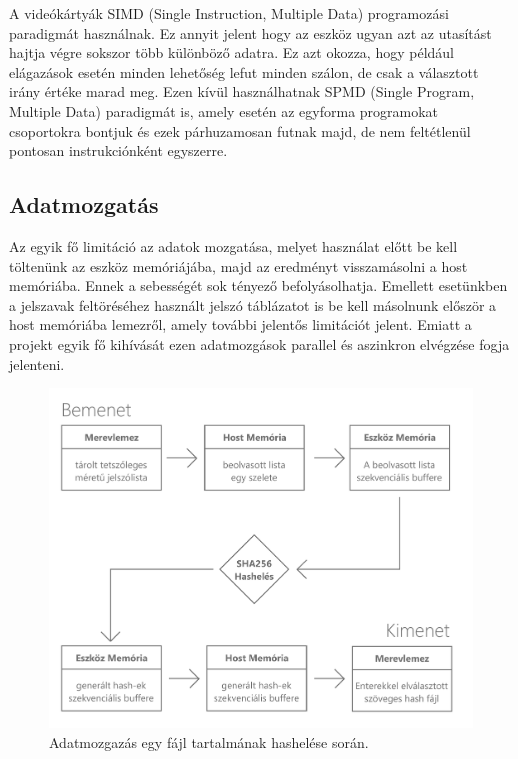 A videókártyák SIMD (Single Instruction, Multiple Data) programozási paradigmát használnak. Ez annyit jelent hogy az eszköz ugyan azt az utasítást hajtja végre sokszor több különböző adatra. Ez azt okozza, hogy például elágazások esetén minden lehetőség lefut minden szálon, de csak a választott irány értéke marad meg. Ezen kívül használhatnak SPMD (Single Program, Multiple Data) paradigmát is, amely esetén az egyforma programokat csoportokra bontjuk és ezek párhuzamosan futnak majd, de nem feltétlenül pontosan instrukciónként egyszerre. 



\subsection{Adatmozgatás}

Az egyik fő limitáció az adatok mozgatása, melyet használat előtt be kell töltenünk az eszköz memóriájába, majd az eredményt visszamásolni a host memóriába. Ennek a sebességét sok tényező befolyásolhatja. Emellett esetünkben a jelszavak feltöréséhez használt jelszó táblázatot is be kell másolnunk először a host memóriába lemezről, amely további jelentős limitációt jelent. Emiatt a projekt egyik fő kihívását ezen adatmozgások parallel és aszinkron elvégzése fogja jelenteni.


\begin{figure}[H]
    \centering 
    \includegraphics[width=\textwidth]{images/pdf/data-movement.pdf}
    \caption{Adatmozgazás egy fájl tartalmának hashelése során.}
    \label{fig:lineargpu}
\end{figure}


